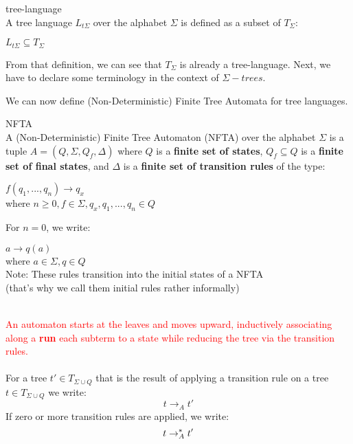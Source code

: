 \documentclass{llncs}
\begin{document}
\begin{definition}{tree-language \cite{automata-xml}}
	\\
	A tree language \(L_{t\Sigma}\) over the alphabet \(\Sigma\) is defined as a subset of \(T_\Sigma\):
	\begin{center}
		\(L_{t\Sigma} \subseteq T_\Sigma\)
	\end{center}	
\end{definition}

From that definition, we can see that \(T_\Sigma\) is already a tree-language.
Next, we have to declare some terminology in the context of $\Sigma-trees$.

\pagebreak
We can now define (Non-Deterministic) Finite Tree Automata for tree languages.

\begin{definition}{NFTA \cite{tata-nfta}}
	\\
	A (Non-Deterministic) Finite Tree Automaton (NFTA) over the alphabet \(\Sigma\) is a tuple \(A = (Q, \Sigma, Q_f ,\Delta)\) where
	\(Q\) is a \textbf{finite set of states}, \(Q_f \subseteq Q\) is a  \textbf{finite set of final states}, and \(\Delta\) is a \textbf{finite set of transition rules} of the type:
	
	\begin{center}
		\(f(q_1,...,q_n) \rightarrow q_x\) \\
		where \(n \ge 0, f \in \Sigma, q_x, q_1,...,q_n \in Q \)
	\end{center}
	For \(n = 0\), we write:
	\begin{center}
		\(a \rightarrow q(a)\) \\
		where  \(a \in \Sigma, q \in Q \) \\
		Note: These rules transition into the initial states of a NFTA
		\\(that's why we call them initial rules rather informally)
	\end{center}
	~\\
	\textcolor{red}{
	An automaton starts at
	the leaves and moves upward, inductively associating along a \textbf{run} each subterm to a state while reducing the tree via the transition rules.}
	\\\\
	For a tree $t' \in T_{\Sigma \cup Q}$ that is the result of applying a transition rule on a tree $t \in T_{\Sigma \cup Q}$ we write:
		$$t \rightarrow_A t'$$
	If zero or more transition rules are applied, we write:
		$$t \rightarrow_A^* t'$$
\end{definition}
\end{document}
